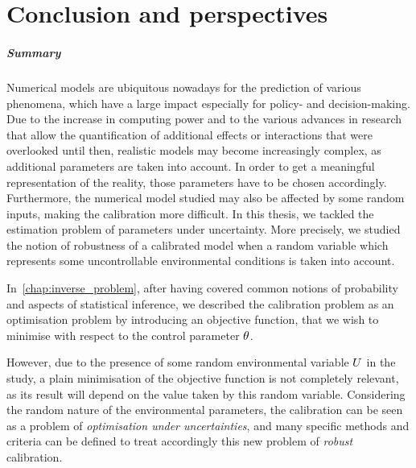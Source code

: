 \documentclass[../../Main_ManuscritThese.tex]{subfiles}
\begin{document}
\pagestyle{conclusionStyle}



\TitleBtwLines
\chapter*{Conclusion and perspectives}
{}
\label{chap:Conclusion}
\renewcommand{\thesection}{} %

\paragraph{Summary}

Numerical models are ubiquitous nowadays for the prediction of various
phenomena, which have a large impact especially for policy- and
decision-making.  Due to the increase in computing power and to the
various advances in research that allow the quantification of
additional effects or interactions that were overlooked until then,
realistic models may become increasingly complex, as additional
parameters are taken into account. In order to get a meaningful
representation of the reality, those parameters have to be chosen
accordingly. Furthermore, the numerical model studied may also be
affected by some random inputs, making the calibration more
difficult. In this thesis, we tackled the estimation problem of
parameters under uncertainty. More precisely, we studied the notion of
robustness of a calibrated model when a random variable which
represents some uncontrollable environmental conditions is taken into
account.


In~\cref{chap:inverse_problem}, after having covered common notions
of probability and aspects of statistical inference, we described 
the calibration problem as an optimisation problem by introducing an
objective function, that we wish to minimise with respect to the
control parameter $\theta$.

However, due to the presence of some random environmental variable
$U$ in the study, a plain minimisation of the objective function is
not completely relevant, as its result will depend on the value taken
by this random variable.  Considering the random nature of
the {environmental parameters}, the calibration can be seen as a
problem of \emph{optimisation under uncertainties}, and many specific
methods and criteria can be defined to treat accordingly this new
problem of \emph{robust} calibration.
\end{document}
